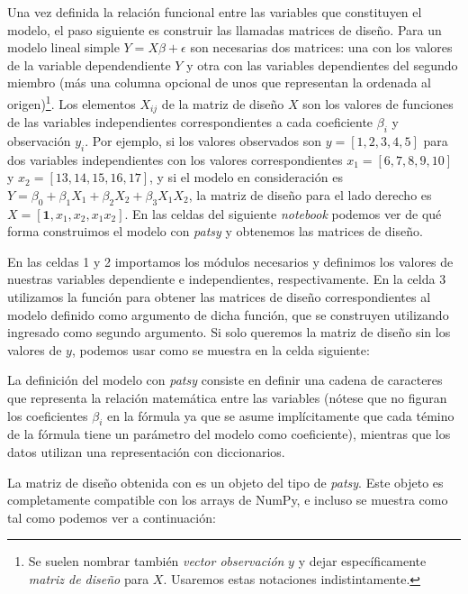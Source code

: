 Una vez definida la relación funcional entre las variables que constituyen el modelo, el paso siguiente es construir las llamadas matrices de diseño. Para un modelo lineal simple $Y = X \beta + \epsilon$ son necesarias dos matrices: una con los valores de la variable dependendiente $Y$ y otra con las variables dependientes del segundo miembro (más una columna opcional de unos que representan la ordenada al origen)\footnote{Se suelen nombrar también \textit{vector observación} $y$ y dejar específicamente \textit{matriz de diseño} para $X$. Usaremos estas notaciones indistintamente.}.
Los elementos $X_{ij}$ de la matriz de diseño $X$ son los valores de funciones de las variables independientes correspondientes a cada coeficiente $\beta_i$ y observación $y_i$. Por ejemplo, si los valores observados son $y = [ 1, 2, 3, 4, 5 ]$ para dos variables independientes con los valores correspondientes $x_1 = [6, 7, 8, 9, 10 ]$ y $x_2 = [13, 14, 15, 16, 17 ]$, y si el modelo en consideración es $Y = \beta_0 + \beta_1 X_1 + \beta_2 X_2 + \beta_3 X_1 X_2$, la matriz de diseño para el lado derecho es $X = [\bm{1}, x_1, x_2, x_1 x_2]$. En las celdas del siguiente \textit{notebook} podemos ver de qué forma construimos el modelo con \textit{patsy} y obtenemos las matrices de diseño.


En las celdas 1 y 2 importamos los módulos necesarios y definimos los valores de nuestras variables dependiente e independientes, respectivamente. En la celda 3 utilizamos la función  para obtener las matrices de diseño correspondientes al modelo definido como argumento de dicha función, que se construyen utilizando  ingresado como segundo argumento. Si solo queremos la matriz de diseño sin los valores de $y$, podemos usar  como se muestra en la celda siguiente:


La definición del modelo con \textit{patsy} consiste en definir una cadena de caracteres que representa la relación matemática entre las variables (nótese que no figuran los coeficientes $\beta_i$ en la fórmula ya que se asume implícitamente que cada témino de la fórmula tiene un parámetro del modelo como coeficiente), mientras que los datos utilizan una representación con diccionarios.

La matriz de diseño obtenida con  es un objeto del tipo  de \textit{patsy}. Este objeto es completamente compatible con los arrays de NumPy, e incluso se muestra como tal como podemos ver a continuación:

